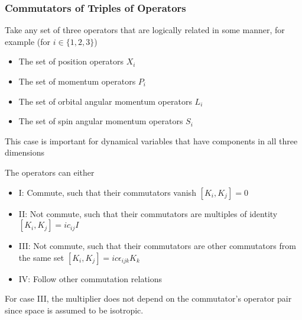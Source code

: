 \documentclass[8pt,t,mathserif,aspectratio=169]{beamer}
\begin{document}
\begin{frame}
  \frametitle{Commutators of Triples of Operators}
  \vspace{1mm}
  Take any set of three operators that are logically related in some manner, for example (for $i \in \{1,2,3\}$)
  \begin{itemize}
    \item The set of position operators $X_i$
    \item The set of momentum operators $P_i$
    \item The set of orbital angular momentum operators $L_i$
    \item The set of spin angular momentum operators $S_i$
  \end{itemize}
  This case is important for dynamical variables that have components in all three dimensions

  The operators can either
  \begin{itemize}
    \item I: Commute, such that their commutators vanish $[K_i,K_j] = 0$
    \item II: Not commute, such that their commutators are multiples of identity $[K_i,K_j] = i c_{ij} I$
    \item III: Not commute, such that their commutators are other commutators from the same set $[K_i,K_j] = i c \epsilon_{ijk} K_k$
    \item IV: Follow other commutation relations
  \end{itemize}
  For case III, the multiplier does not depend on the commutator's operator pair since space is assumed to be isotropic. 
\end{frame}
\end{document}

